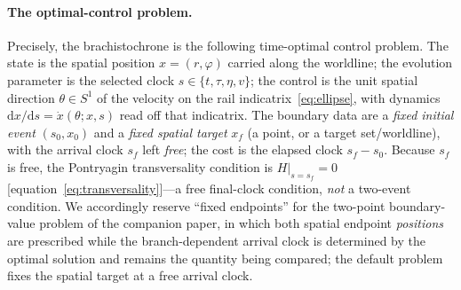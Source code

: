 \documentclass[12pt]{iopart}
\newcommand{\dd}{\mathrm{d}}
\begin{document}
\paragraph{The optimal-control problem.} Precisely, the brachistochrone is the
following time-optimal control problem. The state is the spatial position
$x=(r,\varphi)$ carried along the worldline; the evolution parameter is the selected
clock $s\in\{t,\tau,\eta,v\}$; the control is the unit spatial direction $\theta\in
S^1$ of the velocity on the rail indicatrix~\eqref{eq:ellipse}, with dynamics
$\dd x/\dd s=\dot x(\theta;x,s)$ read off that indicatrix. The boundary data are a
\emph{fixed initial event} $(s_0,x_0)$ and a \emph{fixed spatial target} $x_f$ (a
point, or a target set/worldline), with the arrival clock $s_f$ left \emph{free}; the
cost is the elapsed clock $s_f-s_0$. Because $s_f$ is free, the Pontryagin
transversality condition is $H|_{s=s_f}=0$ [equation~\eqref{eq:transversality}]---a free
final-clock condition, \emph{not} a two-event condition. We accordingly reserve
``fixed endpoints'' for the two-point boundary-value problem of the companion paper, in
which both spatial endpoint \emph{positions} are prescribed while the branch-dependent
arrival clock is determined by the optimal solution and remains the quantity being
compared; the default problem fixes the spatial target at a free arrival clock.
\end{document}
